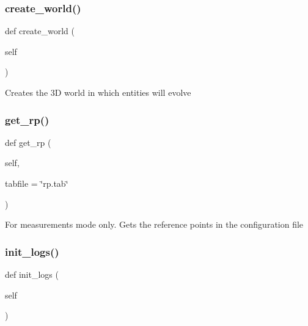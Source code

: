 \subsubsection{\texorpdfstring{create\+\_\+world()}{create\_world()}}
{\footnotesize\ttfamily def create\+\_\+world (\begin{DoxyParamCaption}\item[{}]{self }\end{DoxyParamCaption})}

\begin{DoxyVerb}Creates the 3D world in which entities will evolve\end{DoxyVerb}
 \mbox{\label{classapplication_1_1_application_afded811885b0390450238ee8487d992a}} 
\subsubsection{\texorpdfstring{get\+\_\+rp()}{get\_rp()}}
{\footnotesize\ttfamily def get\+\_\+rp (\begin{DoxyParamCaption}\item[{}]{self,  }\item[{}]{tabfile = {\ttfamily \char`\"{}rp.tab\char`\"{}} }\end{DoxyParamCaption})}

\begin{DoxyVerb}For measurements mode only. Gets the reference points in the configuration file\end{DoxyVerb}
 \mbox{\label{classapplication_1_1_application_a875504ef90230b137861e39cc7ba6c7f}} 
\subsubsection{\texorpdfstring{init\+\_\+logs()}{init\_logs()}}
{\footnotesize\ttfamily def init\+\_\+logs (\begin{DoxyParamCaption}\item[{}]{self }\end{DoxyParamCaption})}

